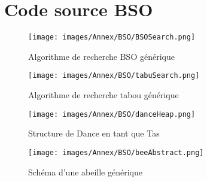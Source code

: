 \appendix
\chapter{Code source BSO}
\begin{figure}[H]
	\centering
	\texttt{[image: images/Annex/BSO/BSOSearch.png]}
	\caption{Algorithme de recherche BSO générique}
\end{figure}

\begin{figure}[H]
	\centering
	\texttt{[image: images/Annex/BSO/tabuSearch.png]}
	\caption{Algorithme de recherche tabou générique}
\end{figure}

\begin{figure}[H]
	\centering
	\texttt{[image: images/Annex/BSO/danceHeap.png]}
	\caption{Structure de Dance en tant que Tas}
\end{figure}

\begin{figure}[H]
	\centering
	\texttt{[image: images/Annex/BSO/beeAbstract.png]}
	\caption{Schéma d'une abeille générique}
\end{figure}




%
%
